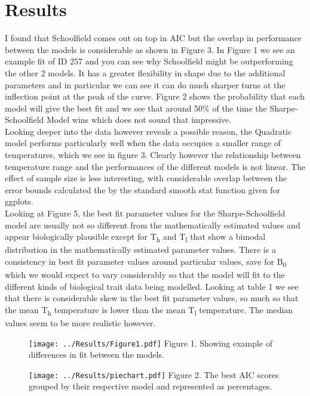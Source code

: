 \documentclass[fontsize=11pt]{scrartcl}\usepackage[]{graphicx}\usepackage[]{color}
\begin{document}
  \section{Results}
  I found that Schoolfield comes out on top in AIC but the overlap in performance between the models is considerable as shown in Figure 3. 
  In Figure 1 we see an example fit of ID 257 and you can see why Schoolfield 
  might be outperforming the other 2 models. It has a greater flexibility in shape due to the 
  additional parameters and in particular we can see it can do much sharper turns at the inflection point at 
  the peak of the curve. Figure 2 shows the probability that each model will give the best fit and we see that around 50\% of the time
  the Sharpe-Schoolfield Model wins which does not sound that impressive. \\
  Looking deeper into the data however reveals a possible reason, the Quadratic model performs particularly well when the data 
  occupies a smaller range of temperatures, which we see in figure 3. Clearly however the relationship between temperature range and
  the performances of the different models is not linear. The effect of sample size is less interesting, with considerable overlap between the
  error bounds calculated the by the standard smooth stat function given for ggplots. 
   \\
  Looking at Figure 5, the best fit parameter values for 
  the Sharpe-Schoolfield model are usually not so different from the 
  mathematically estimated values and appear biologically plausible except for T\textsubscript{h} and T\textsubscript{l} 
  that show a bimodal distribution in the mathematically estimated parameter values. There is a consistency in best fit parameter values 
  around particular values, save for B\textsubscript{0} which we would expect to vary considerably so that the model will fit to 
  the different kinds of biological trait data being modelled. Looking at table 1 we see that there is considerable skew in 
  the best fit parameter values, so much so that the mean T\textsubscript{h} temperature is lower than the mean T\textsubscript{l} 
  temperature. The median values seem to be more realistic however.
  
  \begin{figure}[h]
    \texttt{[image: ../Results/Figure1.pdf]}
    Figure 1. Showing example of differences in fit between the models.
  \end{figure}

  \begin{figure}[]
    \texttt{[image: ../Results/piechart.pdf]}
    Figure 2. The best AIC scores grouped by their respective model and represented as percentages. 
  \end{figure}
\end{document}
